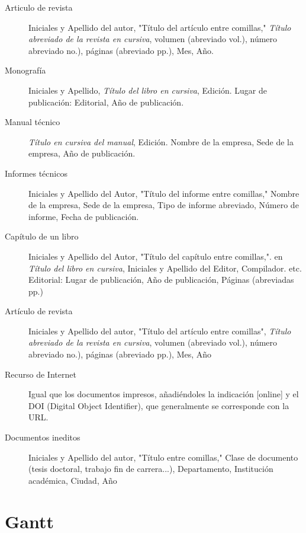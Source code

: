 \begin{description}
	\item[Articulo de revista] Iniciales y Apellido del autor, "Título del artículo entre comillas," \textit{Título abreviado de la revista en cursiva}, volumen (abreviado vol.), número abreviado no.), páginas (abreviado pp.), Mes, Año.
	\item[Monografía] Iniciales y Apellido, \textit{Título del libro en cursiva}, Edición. Lugar de publicación: Editorial, Año de publicación.
	\item[Manual técnico] \textit{Título en cursiva del manual}, Edición. Nombre de la empresa, Sede de la empresa, Año de publicación.
	\item[Informes técnicos] Iniciales y Apellido del Autor, "Título del informe entre comillas," Nombre de la empresa, Sede de la empresa, Tipo de informe abreviado, Número de informe, Fecha de publicación.
	\item[Capítulo de un libro] Iniciales y Apellido del Autor, "Título del capítulo entre comillas,". en \textit{Título del libro en cursiva}, Iniciales y Apellido del Editor, Compilador. etc. Editorial: Lugar de publicación, Año de publicación, Páginas (abreviadas pp.)
	\item[Artículo de revista] Iniciales y Apellido del autor, "Título del artículo entre comillas", \textit{Título abreviado de la revista en cursiva}, volumen (abreviado vol.), número abreviado no.), páginas (abreviado pp.), Mes, Año
	\item[Recurso de Internet] Igual que los documentos impresos, añadiéndoles la indicación [online] y el DOI (Digital Object Identifier), que generalmente se corresponde con la URL.
	\item[Documentos ineditos] Iniciales y Apellido del autor, "Título entre comillas," Clase de documento (tesis doctoral, trabajo fin de carrera...), Departamento, Institución académica, Ciudad, Año
\end{description}




\section{Gantt}


